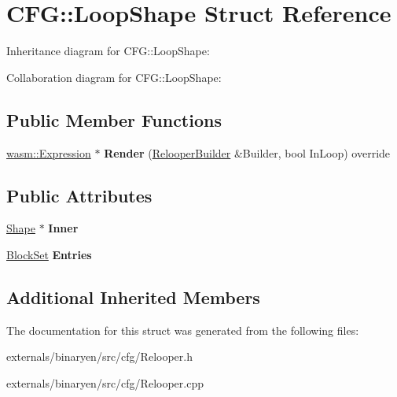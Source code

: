 \hypertarget{struct_c_f_g_1_1_loop_shape}{}\section{C\+FG\+:\+:Loop\+Shape Struct Reference}
\label{struct_c_f_g_1_1_loop_shape}


Inheritance diagram for C\+FG\+:\+:Loop\+Shape\+:


Collaboration diagram for C\+FG\+:\+:Loop\+Shape\+:
\subsection*{Public Member Functions}
\begin{DoxyCompactItemize}
\item 
\mbox{\label{struct_c_f_g_1_1_loop_shape_a26737a12ffab6c674d787898d2bfc28b}} 
\mbox{\hyperlink{classwasm_1_1_expression}{wasm\+::\+Expression}} $\ast$ {\bfseries Render} (\mbox{\hyperlink{class_c_f_g_1_1_relooper_builder}{Relooper\+Builder}} \&Builder, bool In\+Loop) override
\end{DoxyCompactItemize}
\subsection*{Public Attributes}
\begin{DoxyCompactItemize}
\item 
\mbox{\label{struct_c_f_g_1_1_loop_shape_aca53e9d7fdd7e7d0590657665752a8d5}} 
\mbox{\hyperlink{struct_c_f_g_1_1_shape}{Shape}} $\ast$ {\bfseries Inner}
\item 
\mbox{\label{struct_c_f_g_1_1_loop_shape_ad054d2ac359428bcbb4873cc2a15671e}} 
\mbox{\hyperlink{struct_c_f_g_1_1_insert_ordered_set}{Block\+Set}} {\bfseries Entries}
\end{DoxyCompactItemize}
\subsection*{Additional Inherited Members}


The documentation for this struct was generated from the following files\+:\begin{DoxyCompactItemize}
\item 
externals/binaryen/src/cfg/Relooper.\+h\item 
externals/binaryen/src/cfg/Relooper.\+cpp\end{DoxyCompactItemize}
